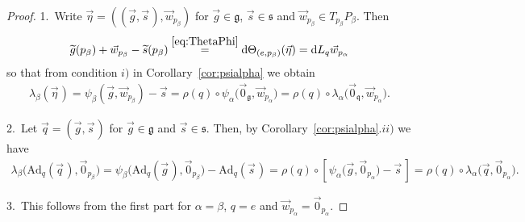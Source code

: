 \documentclass[11pt]{article}
\numberwithin{equation}{section}
\newcommand{\wt}[1]{\widetilde{#1}}
\newcommand{\Add}[1]{\mathrm{Ad}_{#1}}
\begin{document}
\begin{proof}
1.~Write $\vec{\eta}=((\vec{g},\vec{s}\hspace{1pt}),\vec{w}_{p_\beta})$ for $\vec{g}\in\mathfrak{g}$, $\vec{s}\in\mathfrak{s}$ and
$\vec{w}_{p_\beta}\in T_{p_\beta}P_\beta$.
Then
\begin{gather*}
\wt{g}(p_\beta)
+\vec{w}_{p_\beta}-\wt{s}(p_\beta)\stackrel{\eqref{eq:ThetaPhi}}{=}\mathrm{d}\Theta_{(e,p_\beta)}(\vec{\eta})=\mathrm{d}
L_q\vec{w}_{p_\alpha}
\end{gather*}
so that from condition $i)$ in Corollary~\ref{cor:psialpha} we obtain
\begin{gather*}
\lambda_\beta(\vec{\eta}\hspace{1pt})=\psi_\beta(\vec{g},\vec{w}_{p_\beta})-\vec{s}
=\rho(q)\circ\psi_\alpha\big(\vec{0}_{\mathfrak{g}},\vec{w}_{p_\alpha}\big)
=\rho(q)\circ\lambda_\alpha\big(\vec{0}_{\mathfrak{q}},
\vec{w}_{p_\alpha}\big).
\end{gather*}

2.~Let $\vec{q}=(\vec{g},\vec{s}\hspace{1pt})$ for $\vec{g}\in\mathfrak{g}$ and $\vec{s}\in \mathfrak{s}$.
Then, by Corollary~\ref{cor:psialpha}.$ii)$ we have
\begin{gather*}
\lambda_\beta\big(\Add{q}(\vec{q}\hspace{1pt}),\vec{0}_{p_\beta}\big)=\psi_\beta\big(\Add{q}(\vec{g}\hspace{1pt}),\vec{0}_{p_\beta}\big)\!-
\Add{q}(\vec{s}\hspace{1pt})
=\rho(q)\circ [\hspace{1pt}\psi_\alpha\big(\vec{g},\vec{0}_{p_\alpha}\big)\!- \vec{s}\hspace{2pt}] =\rho(q) \circ
\lambda_\alpha\big(\vec{q},\vec{0}_{p_\alpha}\big).
\end{gather*}

3.~This follows from the f\/irst part for $\alpha=\beta$, $q=e$ and $\vec{w}_{p_\alpha}=\vec{0}_{p_\alpha}$.


\end{proof}
\end{document}
